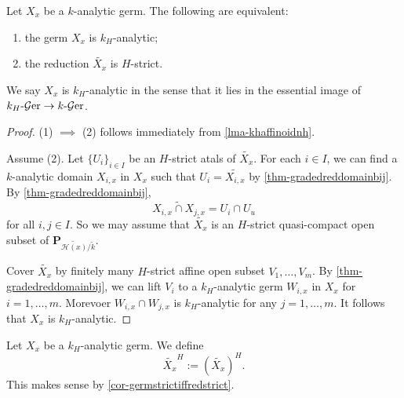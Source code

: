 \begin{corollary}\label{cor-germstrictiffredstrict}
    Let $X_x$ be a $k$-analytic germ. The following are equivalent:
    \begin{enumerate}
        \item the germ $X_x$ is $k_H$-analytic;
        \item the reduction $\widetilde{X_x}$ is $H$-strict.
    \end{enumerate}
\end{corollary}
We say $X_x$ is $k_H$-analytic in the sense that it lies in the essential image of $k_H\text{-}\mathcal{G}\mathrm{er}\rightarrow k\text{-}\mathcal{G}\mathrm{er}$.
\begin{proof}
    (1) $\implies$ (2) follows immediately from \cref{lma-khaffinoidnh}.

    Assume (2). Let $\{U_i\}_{i\in I}$ be an $H$-strict atals of $\widetilde{X_x}$. For each $i\in I$, we can find a $k$-analytic domain $X_{i,x}$ in $X_x$ such that $U_i=\widetilde{X_{i,x}}$ by \cref{thm-gradedreddomainbij}. By \cref{thm-gradedreddomainbij}, 
    \[
        \widetilde{X_{i,x}\cap X_{j,x}}=U_i\cap U_u
    \]
    for all $i,j\in I$. So we may assume that $\widetilde{X_x}$ is an $H$-strict quasi-compact open subset of $\mathbf{P}_{\widetilde{\mathscr{H}(x)}/\tilde{k}}$.

    Cover $\widetilde{X_x}$ by finitely many $H$-strict affine open subset $V_1,\ldots,V_m$.  By \cref{thm-gradedreddomainbij}, we can lift $V_i$ to a $k_H$-analytic germ $W_{i,x}$ in $X_x$ for $i=1,\ldots,m$. Morevoer $W_{i,x}\cap W_{j,x}$ is $k_H$-analytic for any $j=1,\ldots,m$. It follows that $X_x$ is $k_H$-analytic.
\end{proof}

\begin{definition}
    Let $X_x$ be a $k_H$-analytic germ. We define 
    \[
        \widetilde{X_x}^H:=  \left(\widetilde{X_x}\right)^H.
    \]
    This makes sense by \cref{cor-germstrictiffredstrict}.
\end{definition}

